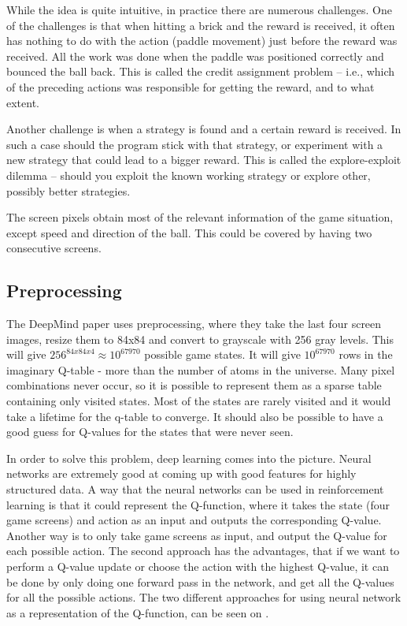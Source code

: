 While the idea is quite intuitive, in practice there are numerous challenges. One of the challenges is that when hitting a brick and the reward is received, it often has nothing to do with the action (paddle movement) just before the reward was received. All the work was done when the paddle was positioned correctly and bounced the ball back. This is called the credit assignment problem – i.e., which of the preceding actions was responsible for getting the reward, and to what extent. 

Another challenge is when a strategy is found and a certain reward is received. In such a case should the program stick with that strategy, or experiment with a new strategy that could lead to a bigger reward. This is called the explore-exploit dilemma – should you exploit the known working strategy or explore other, possibly better strategies.

The screen pixels obtain most of the relevant information of the game situation, except speed and direction of the ball. This could be covered by having two consecutive screens.

\subsection{Preprocessing}
The DeepMind paper uses preprocessing, where they take the last four screen images, resize them to 84x84 and convert to grayscale with 256 gray levels. This will give $256^{84x84x4} \approx 10^{67970}$ possible game states. It will give $10^{67970}$ rows in the imaginary Q-table - more than the number of atoms in the universe. Many pixel combinations never occur, so it is possible to represent them as a sparse table containing only visited states. Most of the states are rarely visited and it would take a lifetime for the q-table to converge. It should also be possible to have a good guess for Q-values for the states that were never seen.  

In order to solve this problem, deep learning comes into the picture. Neural networks are extremely good at coming up with good features for highly structured data. A way that the neural networks can be used in reinforcement learning is that it could represent the Q-function, where it takes the state (four game screens) and action as an input and outputs the corresponding Q-value. Another way is to only take game screens as input, and output the Q-value for each possible action. The second approach has the advantages, that if we want to perform a Q-value update or choose the action with the highest Q-value, it can be done by only doing one forward pass in the network, and get all the Q-values for all the possible actions. The two different approaches for using neural network as a representation of the Q-function, can be seen on .               

